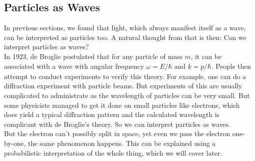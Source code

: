 \subsection{Particles as Waves}
In previous sections, we found that light, which always manifest itself as a wave, can be interpreted as particles too.
A natural thought from that is then:
Can we interpret particles as waves?\\
In 1923, de Broglie postulated that for any particle of mass $m$, it can be associated with a wave with angular frequency $\omega=E/\hbar$ and $\underline{k}=\underline{p}/\hbar$.
People then attempt to conduct experiments to verify this theory.
For example, one can do a diffraction experiment with particle beams.
But experiments of this are usually complicated to administrate as the wavelength of particles can be very small.
But some physicists managed to get it done on small particles like electrons, which does yield a typical diffraction pattern and the calculated wavelength is complicant with de Broglie's theory.
So we can interpret particles as waves.\\
But the electron can't possibly split in space, yet even we pass the electron one-by-one, the same phenomenon happens.
This can be explained using a probabilistic interpretation of the whole thing, which we will cover later.
